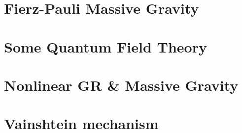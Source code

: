 \documentclass{book}
\numberwithin{equation}{section}
\theoremstyle{definition}
\begin{document}
\newpage





\chapter{Fierz-Pauli Massive Gravity}




\newpage


\chapter{Some Quantum Field Theory}



\newpage




\chapter{Nonlinear GR \& Massive Gravity}



\newpage



\chapter{Vainshtein mechanism}



\newpage
\end{document}
